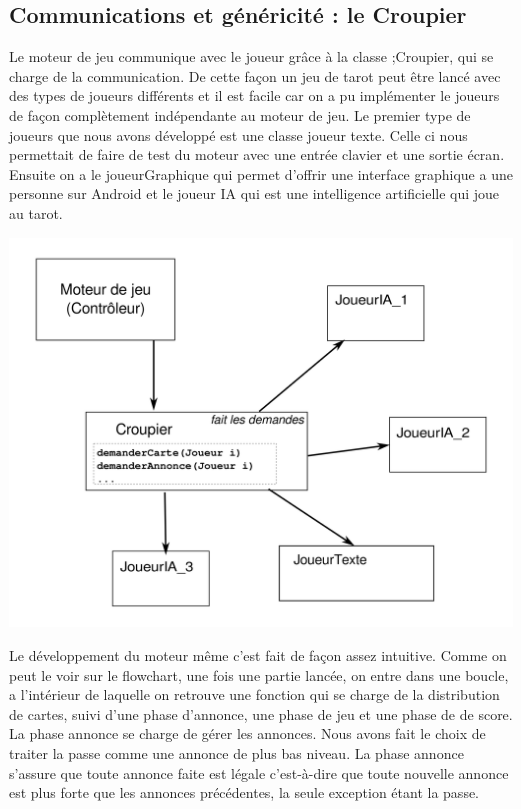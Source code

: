 \documentclass[a4paper]{report}
\begin{document}
		\subsection{Communications et généricité : le Croupier}
			Le moteur de jeu communique avec le joueur grâce à la classe ;Croupier, qui se charge de la communication. De cette façon un jeu de tarot peut être lancé avec des types de 				joueurs différents et il est facile car on a pu implémenter le joueurs de façon complètement indépendante au moteur de jeu. Le premier type de joueurs que nous avons développé 			est une classe joueur texte. Celle ci nous permettait de faire de test du moteur avec une entrée clavier et une sortie écran.
			Ensuite on a le joueurGraphique qui permet d'offrir une interface graphique a une personne sur Android et le joueur IA qui est une intelligence artificielle qui joue au tarot.
				\begin{center}
					\includegraphics[scale=0.7]{Images/croupier.png}
				\end{center}
			Le développement du moteur même c'est fait de façon assez intuitive. Comme on peut le voir sur le flowchart, une fois une partie lancée, on entre dans une boucle, a l'intérieur 				de laquelle on retrouve une fonction qui se charge de la distribution de cartes, suivi d'une phase d'annonce, une phase de jeu et une phase de de score.
			La phase annonce se charge de gérer les annonces. Nous avons fait le choix de traiter la passe comme une annonce de plus bas niveau. La phase annonce s’assure que toute annonce 				faite est légale c'est-à-dire que toute nouvelle annonce est plus forte que les annonces précédentes, la seule exception étant la passe.
\end{document}
